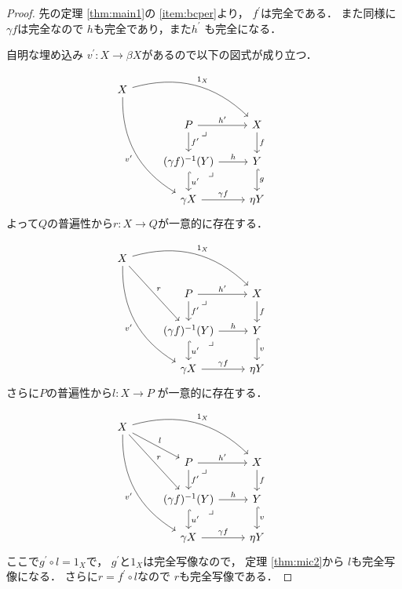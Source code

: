 \documentclass[leqno, a4paper, 12pt, dvipdfmx]{jsarticle}
\begin{document}
\begin{proof}
先の定理
\ref{thm:main1}の
\ref{item:bcper}より，
$f^{\prime}$は完全である．
また同様に$\gamma f$は完全なので
$h$も完全であり，また$h^{\prime}$
も完全になる．

自明な埋め込み
$v^{\prime}\colon X\to \beta X$があるので以下の図式が成り立つ．

\[
\begin{tikzcd}
X \arrow[drr,  "1_{X}", bend left] \arrow[dddr, bend right, "v^{\prime}"']& & \\
 & P \arrow[r, "h^{\prime}"] \arrow[d, "f^{\prime}"] \arrow[dr, phantom, "\lrcorner", very near start]
& X \arrow[d,"f"] & \\
& (\gamma f)^{-1}(Y) \arrow[dr, phantom, "\lrcorner", very near start]\arrow[r,"h"] \arrow[d, hook, "u^{\prime}"] & Y \arrow[d, hook, "g"] \\
& \gamma X\arrow[r,"\gamma f"] &  \eta Y
\end{tikzcd}
\]
よって$Q$の普遍性から$r\colon X\to Q$が一意的に存在する．

\[
\begin{tikzcd}
X \arrow[drr, bend left,  "1_{X}"] \arrow[dddr, bend right, "v^{\prime}"'] \arrow[ddr,  "r"]& & \\
 & P \arrow[r, "h^{\prime}"] \arrow[d, "f^{\prime}"] \arrow[dr, phantom, "\lrcorner", very near start]
& X \arrow[d,"f"] & \\
& (\gamma f)^{-1}(Y)  \arrow[dr, phantom, "\lrcorner", very near start]\arrow[r,"h"] \arrow[d, hook, "u^{\prime}"] & Y \arrow[d, hook, "v"] \\
& \gamma X\arrow[r,"\gamma f"] &  \eta Y
\end{tikzcd}
\]
さらに$P$の普遍性から$l\colon X\to P$
が一意的に存在する．


\[
\begin{tikzcd}
X \arrow[drr, bend left,  "1_{X}"] \arrow[dddr, bend right, "v^{\prime}"'] \arrow[ddr,  "r"]
\arrow[dr,  "l"]& & \\
 & P \arrow[r, "h^{\prime}"] \arrow[d, "f^{\prime}"] \arrow[dr, phantom, "\lrcorner", very near start]
& X \arrow[d,"f"] & \\
& (\gamma f)^{-1}(Y)  \arrow[dr, phantom, "\lrcorner", very near start]\arrow[r,"h"] \arrow[d, hook, "u^{\prime}"] & Y \arrow[d, hook, "v"] \\
& \gamma X\arrow[r,"\gamma f"] &  \eta Y
\end{tikzcd}
\]
ここで$g^{\prime}\circ l=1_{X}$で，
$g^{\prime}$と$1_{X}$は完全写像なので，
定理
\ref{thm:mic2}から
$l$も完全写像になる．
さらに$r=f^{\prime}\circ l$なので
$r$も完全写像である．


\end{proof}
\end{document}

